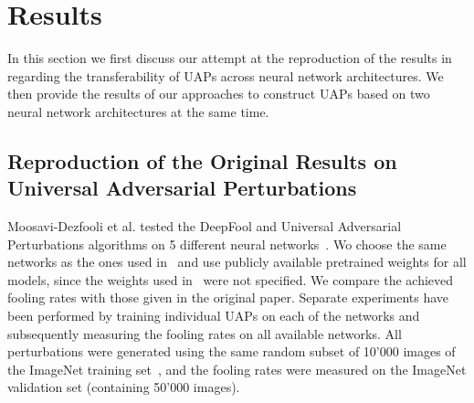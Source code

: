 \documentclass[runningheads]{llncs}
\begin{document}
\section{Results}\label{sec:Results}
In this section we first discuss our attempt at the reproduction of the results in~\cite{moosavidezfooli_universal_2017} regarding the transferability of UAPs across neural network architectures. We then provide the results of our approaches to construct UAPs based on two neural network architectures at the same time.

\subsection{Reproduction of the Original Results on Universal Adversarial Perturbations}
Moosavi-Dezfooli et al. tested the DeepFool and Universal Adversarial Perturbations algorithms on 5 different neural networks~\cite{moosavidezfooli_universal_2017}. 
Wo choose the same networks as the ones used in~\cite{moosavidezfooli_universal_2017} and use publicly available pretrained weights for all models, since the weights used in~\cite{moosavidezfooli_universal_2017} were not specified. We compare the achieved fooling rates with those given in the original paper. Separate experiments have been performed by training individual UAPs on each of the networks and subsequently measuring the fooling rates on all available networks. All perturbations were generated using the same random subset of 10'000 images of the ImageNet training set~\cite{imagenet_cvpr09}, and the fooling rates were measured on the ImageNet validation set (containing 50'000 images).
\end{document}
